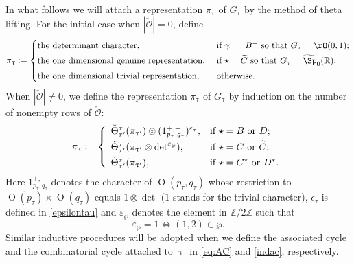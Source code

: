 \documentclass[11pt,a4paper]{amsart}
\newcommand{\CO}{{\mathcal {O}}}
\newcommand{\oO}{\operatorname{O}}
\newcommand{\Z}{\mathbb{Z}}
\newcommand{\R}{\mathbb R}
\numberwithin{equation}{section}
\theoremstyle{remark}
\begin{document}
 In what follows we will attach a representation $\pi_{\uptau}$ of $G_{\uptau}$ by the method of theta lifting. For the initial case when $|\check \CO|=0$,
 define
 \[
 \pi_{\uptau}:= 
 \begin{cases}
 \textrm{the determinant character} , &\text{ if $\gamma _\tau=B^-$ so that $G_\tau=\rO(0,1)$;} \smallskip\\
 \textrm{the one dimensional genuine representation} , &\text{ if $\star=\widetilde C$ so that $G_\tau=\widetilde{\Sp}_0(\R)$;} \smallskip\\
 \textrm{the one dimensional trivial representation} , &\text{ otherwise.}           
 \end{cases}
 \]
 When $|\check \CO|\neq 0$,   we define the representation $\pi_{\uptau}$ of $G_{\uptau}$ by induction on the number of nonempty rows of $\check \CO$:
 \begin{equation}\label{eq:def-pi}
    \pi_{\uptau}:=\left\{
     \begin{array}{ll}          
         \check \Theta_{\tau'}^{\tau}(\pi_{\uptau'})\otimes (1_{p_\tau, q_\tau}^{+,-})^{\varepsilon_{\tau}}, &\hbox{if  $\star=B$ or $D$}; \smallskip \\
         \check \Theta_{\tau'}^{\tau}(\pi_{\uptau'}\otimes \det^{\varepsilon_{\wp}}), &\hbox{if $\star=C$ or $\widetilde C$};  \smallskip\\
              \check \Theta_{\tau'}^{\tau}(\pi_{\uptau'}), &\hbox{if $\star=C^*$ or $D^*$}. \\
            \end{array}
   \right.
 \end{equation}
 Here $1_{p_\tau, q_\tau}^{+,-}$ denotes the character of $\oO(p_\tau, q_\tau)$ whose restriction to $\oO(p_\tau)\times \oO(q_\tau)$ equals $1\otimes \det$ ($1$ stands for the trivial character), $\epsilon_{\tau}$ is defined in \eqref{epsilontau} and
$\varepsilon_{\wp}$ denotes the element in $\Z/2\Z$ such that  \[
 \varepsilon_{\wp}=1\Leftrightarrow  (1,2)\in \wp.
\]
Similar inductive procedures will be adopted when we define the associated cycle and the combinatorial cycle attached to $\uptau$ in 
\eqref{eq:AC} and \eqref{indac}, respectively.
\end{document}
